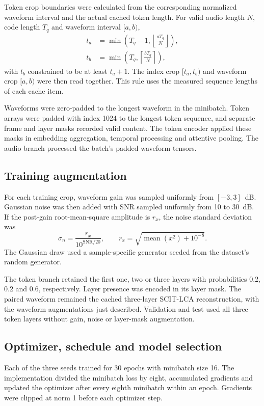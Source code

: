 Token crop boundaries were calculated from the corresponding normalized waveform interval and the actual cached token length. For valid audio length $N$, code length $T_q$ and waveform interval $[a,b)$,
\begin{align}
 t_a&=\min\left(T_q-1,\left\lfloor\frac{aT_q}{N}\right\rfloor\right),
 \nonumber\\
 t_b&=\min\left(T_q,\left\lceil\frac{bT_q}{N}\right\rceil\right),
 \label{eq:sv2-crop}
\end{align}
with $t_b$ constrained to be at least $t_a+1$. The index crop $[t_a,t_b)$ and waveform crop $[a,b)$ were then read together. This rule uses the measured sequence lengths of each cache item.

Waveforms were zero-padded to the longest waveform in the minibatch. Token arrays were padded with index 1024 to the longest token sequence, and separate frame and layer masks recorded valid content. The token encoder applied these masks in embedding aggregation, temporal processing and attentive pooling. The audio branch processed the batch's padded waveform tensors.

\subsection{Training augmentation}
For each training crop, waveform gain was sampled uniformly from $[-3,3]$~dB. Gaussian noise was then added with SNR sampled uniformly from 10 to 30~dB. If the post-gain root-mean-square amplitude is $r_x$, the noise standard deviation was
\begin{equation}
 \sigma_n=\frac{r_x}{10^{\mathrm{SNR}/20}},
 \qquad
 r_x=\sqrt{\operatorname{mean}(x^2)+10^{-8}}.
 \label{eq:sv2-noise}
\end{equation}
The Gaussian draw used a sample-specific generator seeded from the dataset's random generator.

The token branch retained the first one, two or three layers with probabilities 0.2, 0.2 and 0.6, respectively. Layer presence was encoded in its layer mask. The paired waveform remained the cached three-layer SCIT-LCA reconstruction, with the waveform augmentations just described. Validation and test used all three token layers without gain, noise or layer-mask augmentation.

\subsection{Optimizer, schedule and model selection}
Each of the three seeds trained for 30 epochs with minibatch size 16. The implementation divided the minibatch loss by eight, accumulated gradients and updated the optimizer after every eighth minibatch within an epoch. Gradients were clipped at norm 1 before each optimizer step.

